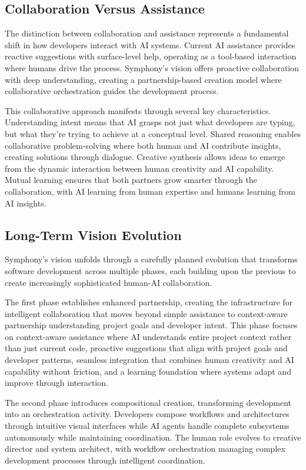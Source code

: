 \subsection{Collaboration Versus Assistance}

The distinction between collaboration and assistance represents a fundamental shift in how developers interact with AI systems. Current AI assistance provides reactive suggestions with surface-level help, operating as a tool-based interaction where humans drive the process. Symphony's vision offers proactive collaboration with deep understanding, creating a partnership-based creation model where collaborative orchestration guides the development process.

This collaborative approach manifests through several key characteristics. Understanding intent means that AI grasps not just what developers are typing, but what they're trying to achieve at a conceptual level. Shared reasoning enables collaborative problem-solving where both human and AI contribute insights, creating solutions through dialogue. Creative synthesis allows ideas to emerge from the dynamic interaction between human creativity and AI capability. Mutual learning ensures that both partners grow smarter through the collaboration, with AI learning from human expertise and humans learning from AI insights.

\subsection{Long-Term Vision Evolution}

Symphony's vision unfolds through a carefully planned evolution that transforms software development across multiple phases, each building upon the previous to create increasingly sophisticated human-AI collaboration.

The first phase establishes enhanced partnership, creating the infrastructure for intelligent collaboration that moves beyond simple assistance to context-aware partnership understanding project goals and developer intent. This phase focuses on context-aware assistance where AI understands entire project context rather than just current code, proactive suggestions that align with project goals and developer patterns, seamless integration that combines human creativity and AI capability without friction, and a learning foundation where systems adapt and improve through interaction.

The second phase introduces compositional creation, transforming development into an orchestration activity. Developers compose workflows and architectures through intuitive visual interfaces while AI agents handle complete subsystems autonomously while maintaining coordination. The human role evolves to creative director and system architect, with workflow orchestration managing complex development processes through intelligent coordination.

